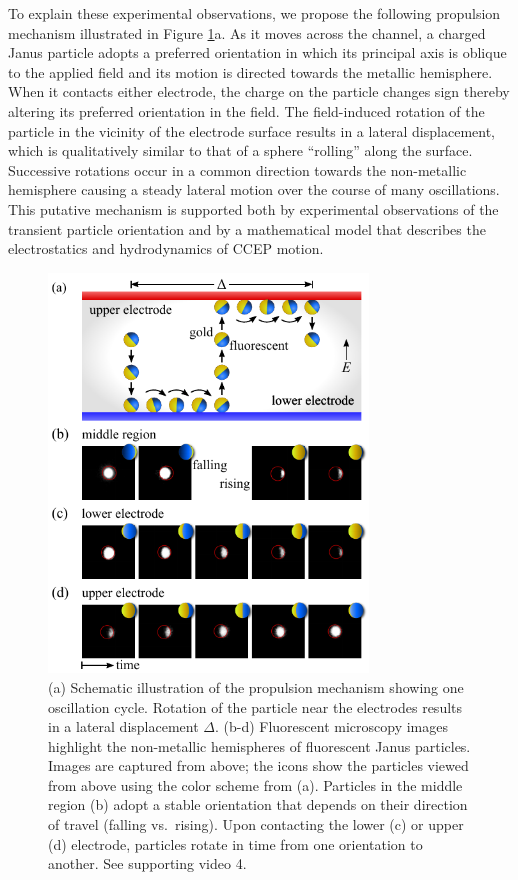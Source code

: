To explain these experimental observations, we propose the following propulsion mechanism illustrated in Figure \ref{fig:2.3}a. 
As it moves across the channel, a charged Janus particle adopts a preferred orientation in which its principal axis is oblique to the applied field and its motion is directed towards the metallic hemisphere.
When it contacts either electrode, the charge on the particle changes sign thereby altering its preferred orientation in the field.
The field-induced rotation of the particle in the vicinity of the electrode surface results in a lateral displacement, which is qualitatively similar to that of a sphere ``rolling'' along the surface.
Successive rotations occur in a common direction towards the non-metallic hemisphere causing a steady lateral motion over the course of many oscillations.
This putative mechanism is supported both by experimental observations of the transient particle orientation and by a mathematical model that describes the electrostatics and hydrodynamics of CCEP motion.

\begin{figure}[p]
\centering
\includegraphics[width=8.5cm]{figures/2_3.pdf}
\caption{(a) Schematic illustration of the propulsion mechanism showing one oscillation cycle.  Rotation of the particle near the electrodes results in a lateral displacement $\Delta$. (b-d) Fluorescent microscopy images highlight the non-metallic hemispheres of fluorescent Janus particles. Images are captured from above; the icons show the particles viewed from above using the color scheme from (a). Particles in the middle region (b) adopt a stable orientation that depends on their direction of travel (falling vs.~rising). Upon contacting the lower (c) or upper (d) electrode, particles rotate in time from one orientation to another. See supporting video 4.}
\label{fig:2.3}
\end{figure}

